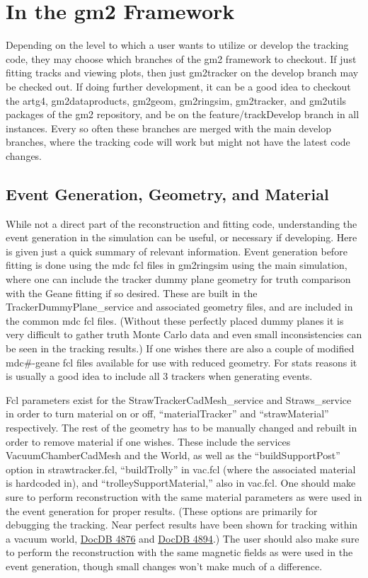 \section{In the gm2 Framework}
\label{sec:Framework}

  Depending on the level to which a user wants to utilize or develop the tracking code, they may choose which branches of the gm2 framework to checkout. If just fitting tracks and viewing plots, then just gm2tracker on the develop branch may be checked out. If doing further development, it can be a good idea to checkout the artg4, gm2dataproducts, gm2geom, gm2ringsim, gm2tracker, and gm2utils packages of the gm2 repository, and be on the feature/trackDevelop branch in all instances. Every so often these branches are merged with the main develop branches, where the tracking code will work but might not have the latest code changes. 

  \subsection{Event Generation, Geometry, and Material}

    While not a direct part of the reconstruction and fitting code, understanding the event generation in the simulation can be useful, or necessary if developing. Here is given just a quick summary of relevant information. Event generation before fitting is done using the mdc fcl files in gm2ringsim using the main simulation, where one can include the tracker dummy plane geometry for truth comparison with the Geane fitting if so desired. These are built in the TrackerDummyPlane\_service and associated geometry files, and are included in the common mdc fcl files. (Without these perfectly placed dummy planes it is very difficult to gather truth Monte Carlo data and even small inconsistencies can be seen in the tracking results.) If one wishes there are also a couple of modified mdc\#-geane fcl files available for use with reduced geometry. For stats reasons it is usually a good idea to include all 3 trackers when generating events.

    Fcl parameters exist for the StrawTrackerCadMesh\_service and Straws\_service in order to turn material on or off, ``materialTracker'' and ``strawMaterial'' respectively. The rest of the geometry has to be manually changed and rebuilt in order to remove material if one wishes. These include the services VacuumChamberCadMesh and the World, as well as the ``buildSupportPost'' option in strawtracker.fcl, ``buildTrolly'' in vac.fcl (where the associated material is hardcoded in), and ``trolleySupportMaterial,'' also in vac.fcl. One should make sure to perform reconstruction with the same material parameters as were used in the event generation for proper results. (These options are primarily for debugging the tracking. Near perfect results have been shown for tracking within a vacuum world, \href{http://gm2-docdb.fnal.gov:8080/cgi-bin/ShowDocument?docid=4876}{DocDB 4876} and \href{http://gm2-docdb.fnal.gov:8080/cgi-bin/ShowDocument?docid=4894}{DocDB 4894}.) The user should also make sure to perform the reconstruction with the same magnetic fields as were used in the event generation, though small changes won't make much of a difference.


